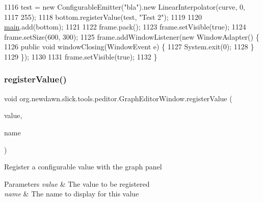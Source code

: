 \begin{DoxyCode}
1116         test = \textcolor{keyword}{new} ConfigurableEmitter(\textcolor{stringliteral}{"bla"}).new LinearInterpolator(curve, 0,
1117                 255);
1118         bottom.registerValue(test, \textcolor{stringliteral}{"Test 2"});
1119 
1120         \mbox{\hyperlink{classorg_1_1newdawn_1_1slick_1_1tools_1_1peditor_1_1_graph_editor_window_a23eceece59208a68fdfe2b6bd742b716}{main}}.add(bottom);
1121 
1122         frame.pack();
1123         frame.setVisible(\textcolor{keyword}{true});
1124         frame.setSize(600, 300);
1125         frame.addWindowListener(\textcolor{keyword}{new} WindowAdapter() \{
1126             \textcolor{keyword}{public} \textcolor{keywordtype}{void} windowClosing(WindowEvent e) \{
1127                 System.exit(0);
1128             \}
1129         \});
1130 
1131         frame.setVisible(\textcolor{keyword}{true});
1132     \}
\end{DoxyCode}
\mbox{\label{classorg_1_1newdawn_1_1slick_1_1tools_1_1peditor_1_1_graph_editor_window_a791df9707751b4a07bbd20ede78b19a0}} 
\subsubsection{\texorpdfstring{register\+Value()}{registerValue()}}
{\footnotesize\ttfamily void org.\+newdawn.\+slick.\+tools.\+peditor.\+Graph\+Editor\+Window.\+register\+Value (\begin{DoxyParamCaption}\item[{\mbox{\hyperlink{classorg_1_1newdawn_1_1slick_1_1particles_1_1_configurable_emitter_1_1_linear_interpolator}{Linear\+Interpolator}}}]{value,  }\item[{String}]{name }\end{DoxyParamCaption})\hspace{0.3cm}{\ttfamily [inline]}}

Register a configurable value with the graph panel


\begin{DoxyParams}{Parameters}
{\em value} & The value to be registered \\
\hline
{\em name} & The name to display for this value \\
\hline
\end{DoxyParams}

